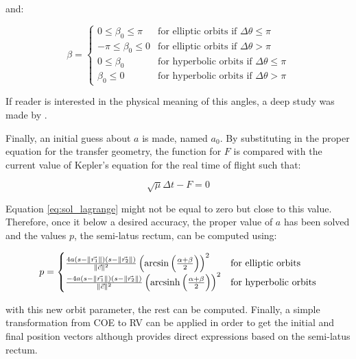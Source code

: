 and:

\begin{equation}
  \beta =
  \begin{cases}
    0 \leqslant \beta_0 \leqslant \pi  & \text{for elliptic orbits if $\Delta \theta \leqslant \pi$}   \\
    -\pi \leqslant \beta_0 \leqslant 0 & \text{for elliptic orbits if $\Delta \theta > \pi$}           \\
    0 \leqslant \beta_0                & \text{for hyperbolic orbits if $\Delta \theta \leqslant \pi$} \\
    \beta_0 \leqslant 0                & \text{for hyperbolic orbits if $\Delta \theta > \pi$}
  \end{cases}
\end{equation}

If reader is interested in the physical meaning of this angles, a deep study was
made by \cite{prussing1979}.

Finally, an initial guess about $a$ is made, named $a_0$. By substituting in the
proper equation for the transfer geometry, the function for $F$ is compared with
the current value of Kepler's equation for the real time of flight such that:

\begin{equation}
  \sqrt{\mu} \Delta t - F = 0
  \label{eq:sol_lagrange}
\end{equation}

Equation \ref{eq:sol_lagrange} might not be equal to zero but close to this
value. Therefore, once it below a desired accuracy, the proper value of $a$ has
been solved and the values $p$, the semi-latus rectum, can be computed using:

\begin{equation}
  p =
  \begin{cases}
    \frac{4a(s - \lVert\vec{r_1}\rVert)(s - \lVert\vec{r_2}\rVert)}{\lVert\vec{c}\rVert^2} \left(\arcsin{\left(\frac{\alpha + \beta}{2} \right)}\right)^{2}   & \text{for elliptic orbits}    \\
    \frac{-4a(s - \lVert\vec{r_1}\rVert)(s - \lVert\vec{r_2}\rVert)}{\lVert\vec{c}\rVert^2} \left(\operatorname{arcsinh}{\left(\frac{\alpha + \beta}{2} \right)}\right)^{2} & \text{for hyperbolic  orbits} \\
  \end{cases}
\end{equation}

with this new orbit parameter, the rest can be computed. Finally, a simple
transformation from COE to RV can be applied in order to get the initial and
final position vectors although \cite{jiang2016} provides direct expressions
based on the semi-latus rectum.
